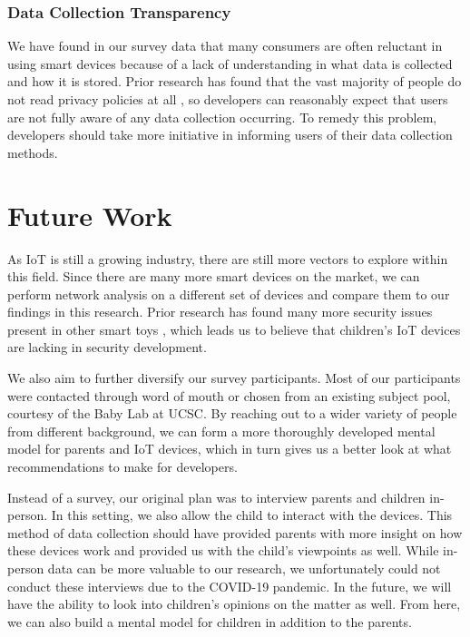 \documentclass[12pt]{ucthesis}
\begin{document}
\subsubsection{Data Collection Transparency}
We have found in our survey data that many consumers are often reluctant in using smart devices because of a lack of understanding in what data is collected and how it is stored. Prior research has found that the vast majority of people do not read privacy policies at all \cite{privacypolicy}, so developers can reasonably expect that users are not fully aware of any data collection occurring. To remedy this problem, developers should take more initiative in informing users of their data collection methods. 

\section{Future Work}
As IoT is still a growing industry, there are still more vectors to explore within this field. Since there are many more smart devices on the market, we can perform network analysis on a different set of devices and compare them to our findings in this research. Prior research has found many more security issues present in other smart toys \cite{cardenas:smarttoys}, which leads us to believe that children's IoT devices are lacking in security development.

We also aim to further diversify our survey participants. Most of our participants were contacted through word of mouth or chosen from an existing subject pool, courtesy of the Baby Lab at UCSC. By reaching out to a wider variety of people from different background, we can form a more thoroughly developed mental model for parents and IoT devices, which in turn gives us a better look at what recommendations to make for developers.

Instead of a survey, our original plan was to interview parents and children in-person. In this setting, we also allow the child to interact with the devices. This method of data collection should have provided parents with more insight on how these devices work and provided us with the child's viewpoints as well. While in-person data can be more valuable to our research, we unfortunately could not conduct these interviews due to the COVID-19 pandemic. In the future, we will have the ability to look into children's opinions on the matter as well. From here, we can also build a mental model for children in addition to the parents.

\nocite{*}


\end{document}
